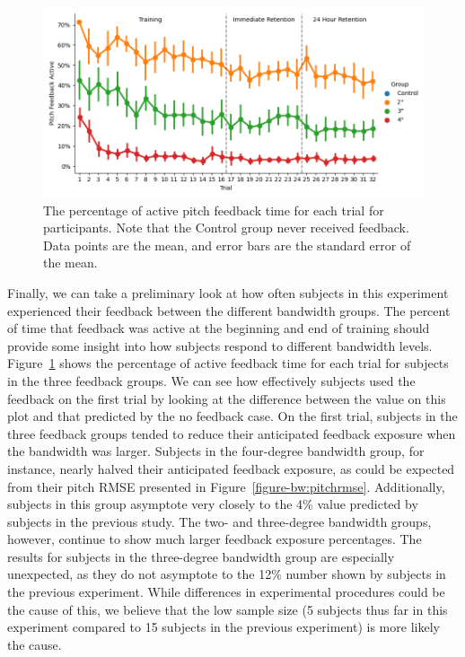 \begin{figure}[tb!]
    \begin{center}
        \includegraphics[width=\linewidth]{figures/Aircraft/Bandwidth-PitchFeedbackOn.png}
        \caption[The percentage of active pitch feedback time for each trial]{The percentage of active pitch feedback time for each trial for participants. Note that the Control group never received feedback. Data points are the mean, and error bars are the standard error of the mean.}
        \label{figure-bw:pitchfeedback}
    \end{center}
\end{figure}

Finally, we can take a preliminary look at how often subjects in this experiment experienced their feedback between the different bandwidth groups.
The percent of time that feedback was active at the beginning and end of training should provide some insight into how subjects respond to different bandwidth levels.
Figure~\ref{figure-bw:pitchfeedback} shows the percentage of active feedback time for each trial for subjects in the three feedback groups.
We can see how effectively subjects used the feedback on the first trial by looking at the difference between the value on this plot and that predicted by the no feedback case.
On the first trial, subjects in the three feedback groups tended to reduce their anticipated feedback exposure when the bandwidth was larger.
Subjects in the four-degree bandwidth group, for instance, nearly halved their anticipated feedback exposure, as could be expected from their pitch RMSE presented in Figure~\ref{figure-bw:pitchrmse}.
Additionally, subjects in this group asymptote very closely to the 4\% value predicted by subjects in the previous study.
The two- and three-degree bandwidth groups, however, continue to show much larger feedback exposure percentages.
The results for subjects in the three-degree bandwidth group are especially unexpected, as they do not asymptote to the 12\% number shown by subjects in the previous experiment.
While differences in experimental procedures could be the cause of this, we believe that the low sample size (5 subjects thus far in this experiment compared to 15 subjects in the previous experiment) is more likely the cause.

